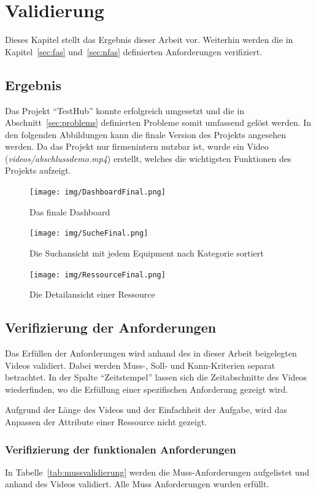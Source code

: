 \section{Validierung}
Dieses Kapitel stellt das Ergebnis dieser Arbeit vor. Weiterhin werden die in 
Kapitel~\ref{sec:fas} und~\ref{sec:nfas} definierten Anforderungen verifiziert.

\subsection{Ergebnis}
Das Projekt ``TestHub'' konnte erfolgreich umgesetzt und die in Abschnitt~\ref{sec:problems}
definierten Probleme somit umfassend gelöst werden. 
In den folgenden Abbildungen kann die finale Version des Projekts angesehen werden.
Da das Projekt nur firmenintern nutzbar ist, wurde ein Video 
(\textit{videos/abschlussdemo.mp4}) erstellt, welches die wichtigsten Funktionen des 
Projekts aufzeigt. 

\begin{figure}[H]
    \texttt{[image: img/DashboardFinal.png]}
    \caption{Das finale Dashboard}
\end{figure}

\begin{figure}[H]
    \texttt{[image: img/SucheFinal.png]}
    \caption{Die Suchansicht mit jedem Equipment nach Kategorie sortiert}
\end{figure}

\begin{figure}[H]
    \texttt{[image: img/RessourceFinal.png]}
    \caption{Die Detailansicht einer Ressource}
\end{figure}

\subsection{Verifizierung der Anforderungen}
Das Erfüllen der Anforderungen wird anhand des in dieser Arbeit beigelegten Videos 
validiert. Dabei werden Muss-, Soll- und Kann-Kriterien separat betrachtet.
In der Spalte ``Zeitstempel'' lassen sich die Zeitabschnitte des Videos wiederfinden,
wo die Erfüllung einer spezifischen Anforderung gezeigt wird.

Aufgrund der Länge des Videos und der Einfachheit der Aufgabe, wird das Anpassen
der Attribute einer Ressource nicht gezeigt.

\subsubsection{Verifizierung der funktionalen Anforderungen}
In Tabelle~\ref{tab:mussvalidierung} werden die Muss-Anforderungen aufgelistet
und anhand des Videos validiert. Alle Muss Anforderungen wurden erfüllt.


